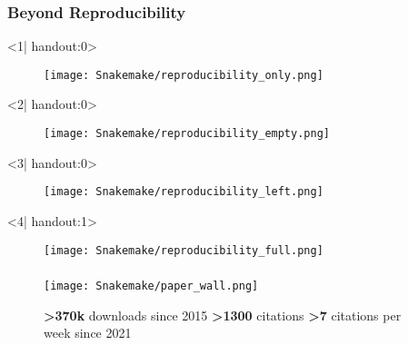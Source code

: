 \begin{frame}
  \frametitle{Beyond Reproducibility}
  \begin{onlyenv}<1| handout:0>
    \begin{figure}
      \centering
      \texttt{[image: Snakemake/reproducibility\_only.png]}
    \end{figure}
  \end{onlyenv}
  \begin{onlyenv}<2| handout:0>
    \begin{figure}
      \centering
      \texttt{[image: Snakemake/reproducibility\_empty.png]}
    \end{figure}
  \end{onlyenv}
  \begin{onlyenv}<3| handout:0>
    \begin{figure}
      \centering
      \texttt{[image: Snakemake/reproducibility\_left.png]}
    \end{figure}
  \end{onlyenv}
    \begin{onlyenv}<4| handout:1>
      \begin{figure}
        \centering
        \texttt{[image: Snakemake/reproducibility\_full.png]}
      \end{figure}
  \end{onlyenv}
\end{frame}

\begin{frame}
  \frametitle{\Snakemake}
  \begin{figure}
    \centering
    \caption{\textbf{>370k} downloads since 2015\newline
             \textbf{>1300} citations\newline
             \textbf{>7} citations per week since 2021}
    \texttt{[image: Snakemake/paper\_wall.png]}
  \end{figure}
\end{frame}

